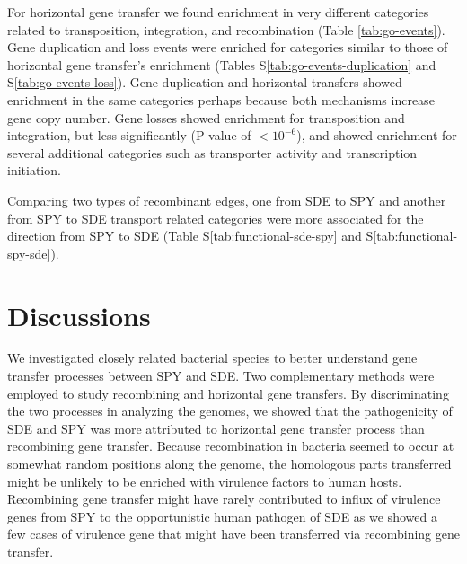 \documentclass[english]{article}
\begin{document}
For horizontal gene transfer we found enrichment in very different categories
related to transposition, integration, and recombination (Table
\ref{tab:go-events}).  Gene duplication and loss events were enriched for
categories similar to those of horizontal gene transfer's enrichment (Tables
S\ref{tab:go-events-duplication} and S\ref{tab:go-events-loss}).
Gene duplication and horizontal transfers showed enrichment in the same
categories perhaps because both mechanisms increase gene copy number.  
Gene losses showed enrichment for transposition and integration, but less
significantly (P-value of $<10^{-6}$), and showed enrichment for several
additional categories such as transporter activity and transcription initiation.

Comparing two types of recombinant edges, one from SDE to SPY and another from
SPY to SDE transport related categories were more associated for the direction
from SPY to SDE
(Table S\ref{tab:functional-sde-spy} and S\ref{tab:functional-spy-sde}).


\section{Discussions}

We investigated closely related bacterial species to better understand gene
transfer processes between SPY and SDE. Two complementary methods were employed
to study recombining and horizontal gene transfers. By discriminating the two
processes in analyzing the genomes, we showed that the pathogenicity of SDE and
SPY was more attributed to horizontal gene transfer process than recombining
gene transfer.  Because recombination in bacteria seemed to occur at somewhat
random positions along the genome, the homologous parts transferred might be
unlikely to be enriched with virulence factors to human hosts.  Recombining gene
transfer might have rarely contributed to influx of virulence genes from SPY to
the opportunistic human pathogen of SDE as we showed a few cases of virulence
gene that might have been transferred via recombining gene transfer.
\end{document}
